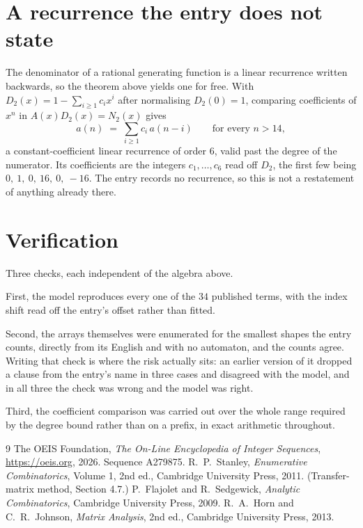 \documentclass[11pt,a4paper]{article}
\theoremstyle{plain}
\theoremstyle{definition}
\begin{document}
\section{A recurrence the entry does not state}

The denominator of a rational generating function is a linear recurrence written backwards, so
the theorem above yields one for free. With $D_2(x)=1-\sum_{i\ge1}c_ix^i$ after normalising
$D_2(0)=1$, comparing coefficients of $x^n$ in $A(x)D_2(x)=N_2(x)$ gives
\[
a(n)\;=\;\sum_{i\ge1}c_i\,a(n-i)\qquad\text{for every }n>14,
\]
a constant-coefficient linear recurrence of order $6$, valid past the degree of the
numerator. Its coefficients are the integers $c_1,\dots,c_{6}$ read off $D_2$, the first few being $0,\ 1,\ 0,\ 16,\ 0,\ -16$. The entry records no recurrence, so this is not a restatement of anything
already there.

\section{Verification}

Three checks, each independent of the algebra above.

First, the model reproduces every one of the $34$ published terms, with the index shift
read off the entry's offset rather than fitted.

Second, the arrays themselves were enumerated for the smallest shapes the entry counts,
directly from its English and with no automaton, and the counts agree. Writing that check is
where the risk actually sits: an earlier version of it dropped a clause from the entry's name
in three cases and disagreed with the model, and in all three the check was wrong and the model
was right.

Third, the coefficient comparison was carried out over the whole range required by the degree
bound rather than on a prefix, in exact arithmetic throughout.

\begin{thebibliography}{9}
 The OEIS Foundation, \emph{The On-Line Encyclopedia of Integer
Sequences}, \url{https://oeis.org}, 2026. Sequence A279875.
 R.~P.~Stanley, \emph{Enumerative Combinatorics}, Volume 1, 2nd ed.,
Cambridge University Press, 2011. (Transfer-matrix method, Section 4.7.)
 P.~Flajolet and R.~Sedgewick, \emph{Analytic Combinatorics}, Cambridge
University Press, 2009.
 R.~A.~Horn and C.~R.~Johnson, \emph{Matrix Analysis}, 2nd ed., Cambridge
University Press, 2013.
\end{thebibliography}
\end{document}
